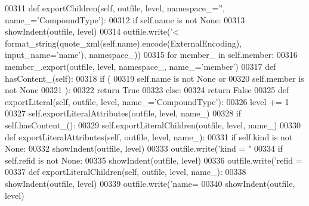 \begin{DoxyCode}
{{{{{{{{{{{{{{{{{{{{{{{{{{{{00311     \textcolor{keyword}{def }exportChildren(self, outfile, level, namespace\_='', name\_='CompoundType'):
00312         \textcolor{keywordflow}{if} self.name \textcolor{keywordflow}{is} \textcolor{keywordflow}{not} \textcolor{keywordtype}{None}:
00313             showIndent(outfile, level)
00314             outfile.write(\textcolor{stringliteral}{'<%
      format_string(quote_xml(self.name).encode(ExternalEncoding), input\_name=\textcolor{stringliteral}{'name'}), namespace\_))
00315         \textcolor{keywordflow}{for} member\_ \textcolor{keywordflow}{in} self.member:
00316             member\_.export(outfile, level, namespace\_, name\_=\textcolor{stringliteral}{'member'})
00317     \textcolor{keyword}{def }hasContent_(self):
00318         \textcolor{keywordflow}{if} (
00319             self.name \textcolor{keywordflow}{is} \textcolor{keywordflow}{not} \textcolor{keywordtype}{None} \textcolor{keywordflow}{or}
00320             self.member \textcolor{keywordflow}{is} \textcolor{keywordflow}{not} \textcolor{keywordtype}{None}
00321             ):
00322             \textcolor{keywordflow}{return} \textcolor{keyword}{True}
00323         \textcolor{keywordflow}{else}:
00324             \textcolor{keywordflow}{return} \textcolor{keyword}{False}
00325     \textcolor{keyword}{def }exportLiteral(self, outfile, level, name\_='CompoundType'):
00326         level += 1
00327         self.exportLiteralAttributes(outfile, level, name\_)
00328         \textcolor{keywordflow}{if} self.hasContent_():
00329             self.exportLiteralChildren(outfile, level, name\_)
00330     \textcolor{keyword}{def }exportLiteralAttributes(self, outfile, level, name\_):
00331         \textcolor{keywordflow}{if} self.kind \textcolor{keywordflow}{is} \textcolor{keywordflow}{not} \textcolor{keywordtype}{None}:
00332             showIndent(outfile, level)
00333             outfile.write(\textcolor{stringliteral}{'kind = "%
00334         \textcolor{keywordflow}{if} self.refid \textcolor{keywordflow}{is} \textcolor{keywordflow}{not} \textcolor{keywordtype}{None}:
00335             showIndent(outfile, level)
00336             outfile.write(\textcolor{stringliteral}{'refid = %
00337     \textcolor{keyword}{def }exportLiteralChildren(self, outfile, level, name\_):
00338         showIndent(outfile, level)
00339         outfile.write(\textcolor{stringliteral}{'name=%
00340         showIndent(outfile, level)
}}}}}}}}}}}}}}}}}}}}}}}}}}}}}}}}
\end{DoxyCode}
